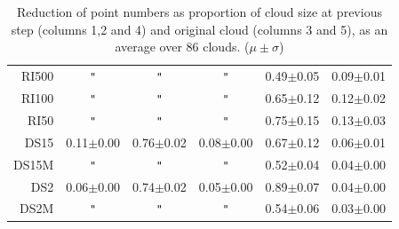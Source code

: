\documentclass[11pt,a4paper]{kth-mag}
\renewcommand{\textquotedbl}{\texttt{"}}
\newcommand{\ditto}[1][.4pt]{\xrfill{#1}~\textquotedbl~\xrfill{#1}}
\begin{document}
\begin{table}
\begin{tabular}{r|ccccc}
    RI500 & \ditto & \ditto & \ditto & 0.49$\pm$0.05 & 0.09$\pm$0.01 \\ 
    RI100 & \ditto & \ditto & \ditto & 0.65$\pm$0.12 & 0.12$\pm$0.02 \\ 
    RI50 & \ditto & \ditto & \ditto & 0.75$\pm$0.15 & 0.13$\pm$0.03 \\
    DS15 & 0.11$\pm$0.00 & 0.76$\pm$0.02 & 0.08$\pm$0.00 & 0.67$\pm$0.12 & 0.06$\pm$0.01 \\
    DS15M & \ditto & \ditto & \ditto & 0.52$\pm$0.04 & 0.04$\pm$0.00 \\ 
    DS2 & 0.06$\pm$0.00 & 0.74$\pm$0.02 & 0.05$\pm$0.00 & 0.89$\pm$0.07 & 0.04$\pm$0.00 \\
    DS2M & \ditto & \ditto & \ditto & 0.54$\pm$0.06 & 0.03$\pm$0.00
  \end{tabular}
  \caption{Reduction of point numbers as proportion of cloud size at previous step
    (columns 1,2 and 4) and original cloud (columns 3 and 5), as an
    average over 86 clouds. ($\mu\pm\sigma$)}
  \label{tbl:time_reduction}
\end{table}
\end{document}
